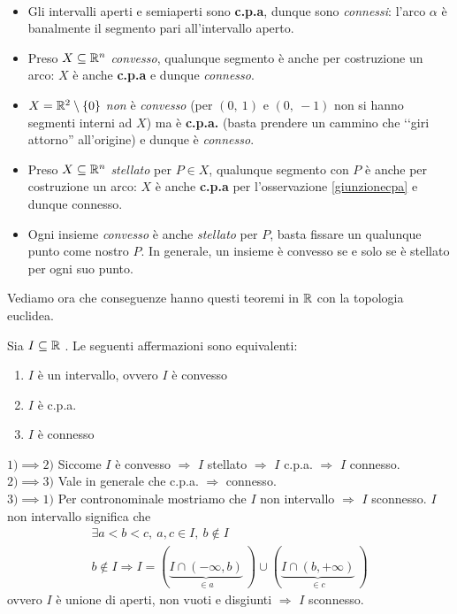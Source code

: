 \begin{example}~{}
\begin{itemize}
	\item Gli intervalli aperti e semiaperti sono \textbf{c.p.a}, dunque sono \textit{connessi}: l'arco $\alpha$ è banalmente il segmento pari all'intervallo aperto.
	\item Preso $X\subseteq\mathbb{R}^n$ \textit{convesso}, qualunque segmento è anche per costruzione un arco: $X$ è anche \textbf{c.p.a} e dunque \textit{connesso}.
	\item $X=\mathbb{R}^{2}\setminus\left\{0\right\}$ \textit{non} è \textit{convesso} (per $\left(0,\ 1\right)$ e $\left(0,\ -1\right)$ non si hanno segmenti interni ad $X$) ma è \textbf{c.p.a.} (basta prendere un cammino che ‘‘giri attorno'' all'origine) e dunque è \textit{connesso}.
	\item Preso $X\subseteq\mathbb{R}^n$ \textit{stellato} per $P\in X$, qualunque segmento con $P$ è anche per costruzione un arco: $X$ è anche \textbf{c.p.a} per l'osservazione \ref{giunzionecpa} e dunque {connesso}.
	\item Ogni insieme \textit{convesso} è anche \textit{stellato} per $P$, basta fissare un qualunque punto come nostro $P$. In generale, un insieme è convesso se e solo se è stellato per ogni suo punto.
\end{itemize}
\end{example}
Vediamo ora che conseguenze hanno questi teoremi in $\mathbb{R}$ con la topologia euclidea.
\begin{theorema}
	Sia $I\subseteq \mathbb{R}$ . Le seguenti affermazioni sono equivalenti:
		\begin{enumerate}
	\item $I$ è un intervallo, ovvero $I$ è convesso
	\item $I$ è c.p.a.
	\item $I$ è connesso			
		\end{enumerate}
\end{theorema}
\begin{demonstration}
	$1) \implies 2)$ Siccome $I$ è convesso $\Rightarrow$ $I$ stellato $\Rightarrow$ $I$ c.p.a. $\Rightarrow$ $I$ connesso. \\
	$2) \implies 3)$ Vale in generale che c.p.a. $\Rightarrow$ connesso.\\
	$3) \implies 1)$ Per contronominale mostriamo che $I$ non intervallo $\Rightarrow$ $I$ sconnesso. $I$ non intervallo significa che 
		\begin{gather*}
			\exists a<b<c,\ a,c\in I,\ b\notin I \\
			b\notin I \Rightarrow I= \left(\underbrace{ I\cap \left(-\infty ,b\right)}_{\in a}\ \right) \cup \left( \underbrace{I\cap \left(b ,+\infty\right)}_{\in c}\ \right)
		\end{gather*}
	ovvero $I$ è unione di aperti, non vuoti e disgiunti $\Rightarrow$ $I$ sconnesso.	
\end{demonstration}
